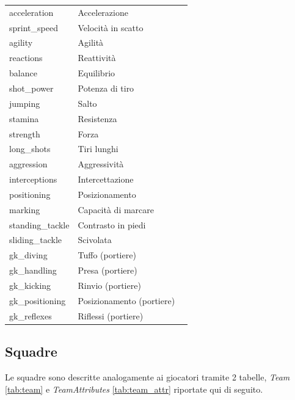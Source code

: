 \documentclass[hidelinks, 12pt]{article}
\begin{document}
\begin{table}[H]
\begin{tabular}{|l|l|l|}
		acceleration & Accelerazione \\
		sprint\_speed & Velocità in scatto \\
		agility & Agilità \\
		reactions & Reattività \\
		balance & Equilibrio \\
		shot\_power & Potenza di tiro \\
		jumping & Salto \\
		stamina & Resistenza \\
		strength & Forza \\
		long\_shots & Tiri lunghi \\
		aggression & Aggressività \\
		interceptions & Intercettazione \\
		positioning & Posizionamento \\
		marking & Capacità di marcare \\
		standing\_tackle & Contrasto in piedi \\
		sliding\_tackle & Scivolata \\
		gk\_diving & Tuffo (portiere) \\
		gk\_handling & Presa (portiere) \\
		gk\_kicking & Rinvio (portiere) \\
		gk\_positioning & Posizionamento (portiere) \\
		gk\_reflexes & Riflessi (portiere) \\
		\hline
	\end{tabular}
\end{table}



\subsection{Squadre}

Le squadre sono descritte analogamente ai giocatori tramite 2 tabelle, {\it Team} \ref{tab:team} e {\it TeamAttributes} \ref{tab:team_attr} riportate qui di seguito.
\end{document}
